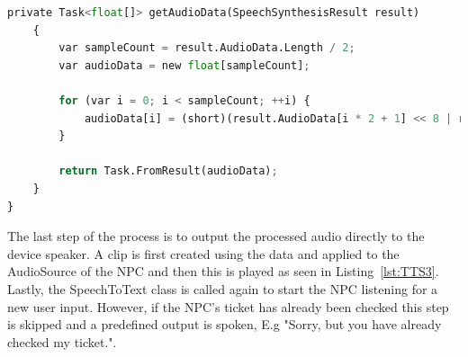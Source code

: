 \newpage
\begin{lstlisting}[caption={Text to Speech - Converting audio from bits to array},label={lst:TTS2},language=python]
private Task<float[]> getAudioData(SpeechSynthesisResult result)
    {
        var sampleCount = result.AudioData.Length / 2;
        var audioData = new float[sampleCount];

        for (var i = 0; i < sampleCount; ++i) {
            audioData[i] = (short)(result.AudioData[i * 2 + 1] << 8 | result.AudioData[i * 2]) / 32768.0F;
        }

        return Task.FromResult(audioData);
    }
}
\end{lstlisting}

\medskip
The last step of the process is to output the processed audio directly to the device speaker. A clip is first created using the data and applied to the AudioSource of the NPC and then this is played as seen in Listing~\ref{lst:TTS3}. Lastly, the SpeechToText class is called again to start the NPC listening for a new user input. However, if the NPC's ticket has already been checked this step is skipped and a predefined output is spoken, E.g "Sorry, but you have already checked my ticket.".

